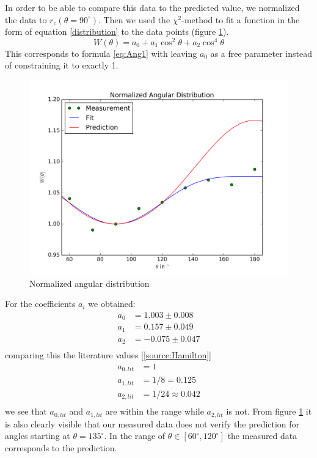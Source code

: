 \documentclass[a4paper,parskip,11pt, DIV12]{scrreprt}
\begin{document}
%
In order to be able to compare this data to the predicted value, we normalized the data to $r_{c}(\theta=90^{\circ})$. Then we used the $\chi^2$-method to fit a function in the form of equation \ref{distribution} to the data points (figure \ref{fig:distribution}).
\begin{equation}
W(\theta) = a_0 + a_1 \cos^2 \theta + a_2 \cos^4 \theta
\end{equation}
This corresponds to formula \ref{eq:Ang1} with leaving $a_0$ as a free parameter instead of constraining it to exactly 1.
%
\begin{figure}[H]
\centering
\includegraphics[scale=0.65]{dist.png}
\caption[Distribution]{Normalized angular distribution}
\label{fig:distribution}
\end{figure}
%
For the coefficients $a_i$ we obtained:
%
\begin{align*}
a_0 &= 1.003 \pm 0.008\\
a_1 &= 0.157 \pm 0.049\\
a_2 &= -0.075 \pm 0.047\\
\end{align*}
%
comparing this the literature values [\ref{source:Hamilton}]
%
\begin{align*}
a_{0,lit} &= 1\\
a_{1,lit} &= 1/8 = 0.125\\
a_{2,lit} &= 1/24 \approx 0.042\\
\end{align*}
%
we see that $a_{0,lit}$ and $a_{1,lit}$ are within the range while $a_{2,lit}$ is not. From figure \ref{fig:distribution} it is also clearly visible that our measured data does not verify the prediction for angles starting at $\theta=135^{\circ}$. In the range of $\theta \in \left[60^{\circ},120^{\circ}\right]$ the measured data corresponds to the prediction.
\end{document}
